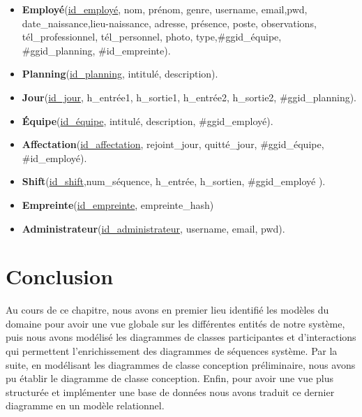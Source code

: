 \begin{itemize}
    \item [\textbullet]\textbf{Employé}(\underline{id\_employé}, nom, prénom, genre, 
        username, email,pwd, date\_naissance,lieu-naissance, adresse, présence, poste, 
        observations, tél\_professionnel, tél\_personnel, photo, type,\#ggid\_équipe, 
        \#ggid\_planning, \#id\_empreinte).

	\item [\textbullet]\textbf{Planning}(\underline{id\_planning}, intitulé, 
        description).
    
    \item [\textbullet]\textbf{Jour}(\underline{id\_jour}, h\_entrée1, h\_sortie1, 
        h\_entrée2, h\_sortie2, \#ggid\_planning).
    
    \item [\textbullet]\textbf{Équipe}(\underline{id\_équipe}, intitulé, 
        description, \#ggid\_employé).
    
    \item [\textbullet]\textbf{Affectation}(\underline{id\_affectation}, 
        rejoint\_jour, quitté\_jour, \#ggid\_équipe, \#id\_employé).
    
    \item [\textbullet]\textbf{Shift}(\underline{id\_shift},num\_séquence, 
        h\_entrée, h\_sortien, \#ggid\_employé ).
    
    \item [\textbullet]\textbf{Empreinte}(\underline{id\_empreinte}, 
        empreinte\_hash)
    
    \item [\textbullet]\textbf{Administrateur}(\underline{id\_administrateur}, 
        username, email, pwd).
\end{itemize}

\section{Conclusion}
Au cours de ce chapitre, nous avons en premier lieu identifié les modèles du
domaine pour avoir une vue globale sur les différentes entités de notre système,
puis nous avons modélisé les diagrammes de classes participantes et
d’interactions qui permettent l’enrichissement des diagrammes de séquences
système. Par la suite, en modélisant les diagrammes de classe conception
préliminaire, nous avons pu établir le diagramme de classe conception.  Enfin,
pour avoir une vue plus structurée et implémenter une base de données nous avons
traduit ce dernier diagramme en un modèle relationnel. 
